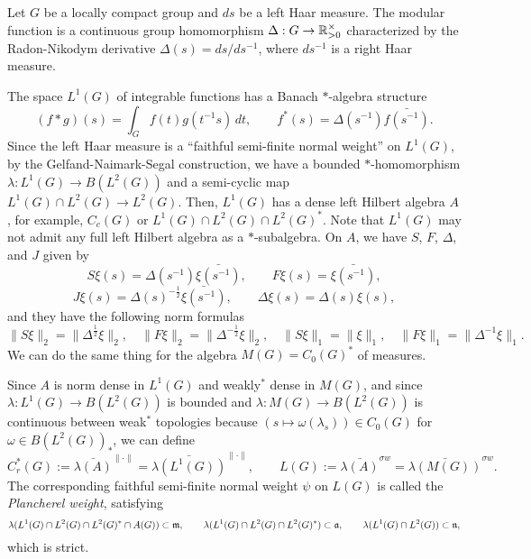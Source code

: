 \documentclass{../../../small}
\begin{document}
\begin{ex}
Let $G$ be a locally compact group and $ds$ be a left Haar measure.
The modular function is a continuous group homomorphism $\Delta:G\to\mathbb{R}_{>0}^\times$ characterized by the Radon-Nikodym derivative $\Delta(s)=ds/ds^{-1}$, where $ds^{-1}$ is a right Haar measure.

The space $L^1(G)$ of integrable functions has a Banach $*$-algebra structure
\[(f*g)(s)=\int_Gf(t)g(t^{-1}s)\,dt,\qquad f^*(s)=\Delta(s^{-1})\bar{f(s^{-1})}.\]
Since the left Haar measure is a ``faithful semi-finite normal weight'' on $L^1(G)$, by the Gelfand-Naimark-Segal construction, we have a bounded $*$-homomorphism $\lambda:L^1(G)\to B(L^2(G))$ and a semi-cyclic map $L^1(G)\cap L^2(G)\to L^2(G)$.
Then, $L^1(G)$ has a dense left Hilbert algebra $A$, for example, $C_c(G)$ or $L^1(G)\cap L^2(G)\cap L^2(G)^*$.
Note that $L^1(G)$ may not admit any full left Hilbert algebra as a $*$-subalgebra.
On $A$, we have $S$, $F$, $\Delta$, and $J$ given by
\[S\xi(s)=\Delta(s^{-1})\bar{\xi(s^{-1})},\qquad F\xi(s)=\bar{\xi(s^{-1})},\]
\[J\xi(s)=\Delta(s)^{-\frac12}\bar{\xi(s^{-1})},\qquad\Delta\xi(s)=\Delta(s)\xi(s),\]
and they have the following norm formulas
\[\|S\xi\|_2=\|\Delta^{\frac12}\xi\|_2,\quad\|F\xi\|_2=\|\Delta^{-\frac12}\xi\|_2,\quad\|S\xi\|_1=\|\xi\|_1,\quad\|F\xi\|_1=\|\Delta^{-1}\xi\|_1.\]
We can do the same thing for the algebra $M(G)=C_0(G)^*$ of measures.

Since $A$ is norm dense in $L^1(G)$ and weakly$^*$ dense in $M(G)$, and since $\lambda:L^1(G)\to B(L^2(G))$ is bounded and $\lambda:M(G)\to B(L^2(G))$ is continuous between weak$^*$ topologies because $(s\mapsto\omega(\lambda_s))\in C_0(G)$ for $\omega\in B(L^2(G))_*$, we can define
\[C_r^*(G):=\bar{\lambda(A)}^{\|\cdot\|}=\bar{\lambda(L^1(G))}^{\|\cdot\|},\qquad L(G):=\bar{\lambda(A)}^{\sigma w}=\bar{\lambda(M(G))}^{\sigma w}.\]
The corresponding faithful semi-finite normal weight $\psi$ on $L(G)$ is called the \emph{Plancherel weight}, satisfying
\[\lambda(L^1(G)\cap L^2(G)\cap L^2(G)^*\cap A(G))\subset\mathfrak{m},\qquad\lambda(L^1(G)\cap L^2(G)\cap L^2(G)^*)\subset\mathfrak{a},\qquad\lambda(L^1(G)\cap L^2(G))\subset\mathfrak{n},\]
which is strict.



\end{ex}
\end{document}
